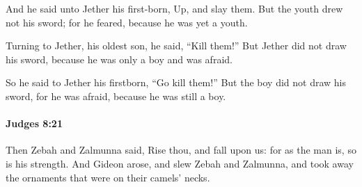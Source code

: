 			\begin{versebox}
					\item[BHS] 
					\item[ASV] And he said unto Jether his first-born, Up, and slay them. But the youth drew not his sword; for he feared, because he was yet a youth.
					\item[NIV] Turning to Jether, his oldest son, he said, “Kill them!” But Jether did not draw his sword, because he was only a boy and was afraid.
					\item[NRSV] So he said to Jether his firstborn, “Go kill them!” But the boy did not draw his sword, for he was afraid, because he was still a boy.
			\end{versebox}

		\paragraph{Judges 8:21} %
			\label{JUDGES-8-21}

			Then Zebah and Zalmunna said, Rise thou, and fall upon us: for as the man is, so is his strength. And Gideon arose, and slew Zebah and Zalmunna, and took away the ornaments that were on their camels’ necks.

